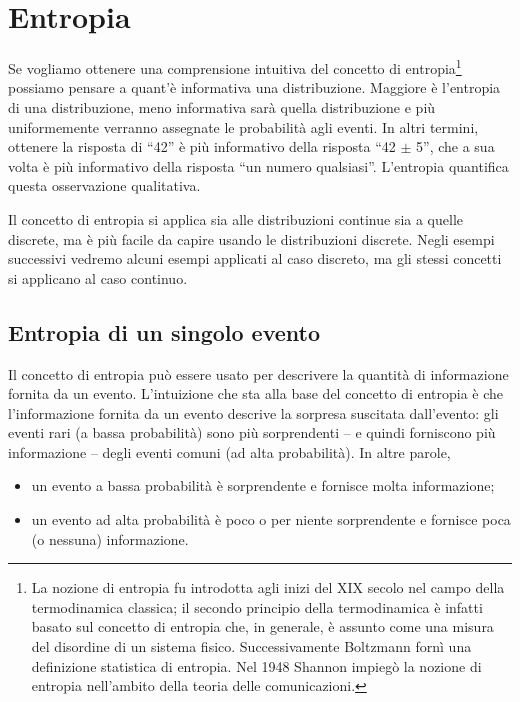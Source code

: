 \documentclass[
  10pt,
  italian,
  a4paper,
  extrafontsizes,onecolumn,openright
  ]{memoir}
\providecommand{\tightlist}{%
  \setlength{\itemsep}{0pt}\setlength{\parskip}{0pt}}
\theoremstyle{definition}
\theoremstyle{definition}
\theoremstyle{definition}
\theoremstyle{definition}
\theoremstyle{remark}
\begin{document}
\hypertarget{entropia}{%
\section{Entropia}\label{entropia}}

Se vogliamo ottenere una comprensione intuitiva del concetto di entropia\footnote{La nozione di entropia fu introdotta agli inizi del XIX secolo nel campo della termodinamica classica; il secondo principio della termodinamica è infatti basato sul concetto di entropia che, in generale, è assunto come una misura del disordine di un sistema fisico. Successivamente Boltzmann fornì una definizione statistica di entropia. Nel 1948 Shannon impiegò la nozione di entropia nell'ambito della teoria delle comunicazioni.} possiamo pensare a quant'è informativa una distribuzione. Maggiore è l'entropia di una distribuzione, meno informativa sarà quella distribuzione e più uniformemente verranno assegnate le probabilità agli eventi. In altri termini, ottenere la risposta di ``42'' è più informativo della risposta ``42 \(\pm\) 5'', che a sua volta è più informativo della risposta ``un numero qualsiasi''. L'entropia quantifica questa osservazione qualitativa.

Il concetto di entropia si applica sia alle distribuzioni continue sia a quelle discrete, ma è più facile da capire usando le distribuzioni discrete. Negli esempi successivi vedremo alcuni esempi applicati al caso discreto, ma gli stessi concetti si applicano al caso continuo.

\hypertarget{entropia-di-un-singolo-evento}{%
\subsection{Entropia di un singolo evento}\label{entropia-di-un-singolo-evento}}

Il concetto di entropia può essere usato per descrivere la quantità di informazione fornita da un evento. L'intuizione che sta alla base del concetto di entropia è che l'informazione fornita da un evento descrive la sorpresa suscitata dall'evento: gli eventi rari (a bassa probabilità) sono più sorprendenti -- e quindi forniscono più informazione -- degli eventi comuni (ad alta probabilità). In altre parole,

\begin{itemize}
\tightlist
\item
  un evento a bassa probabilità è sorprendente e fornisce molta informazione;
\item
  un evento ad alta probabilità è poco o per niente sorprendente e fornisce poca (o nessuna) informazione.
\end{itemize}
\end{document}
